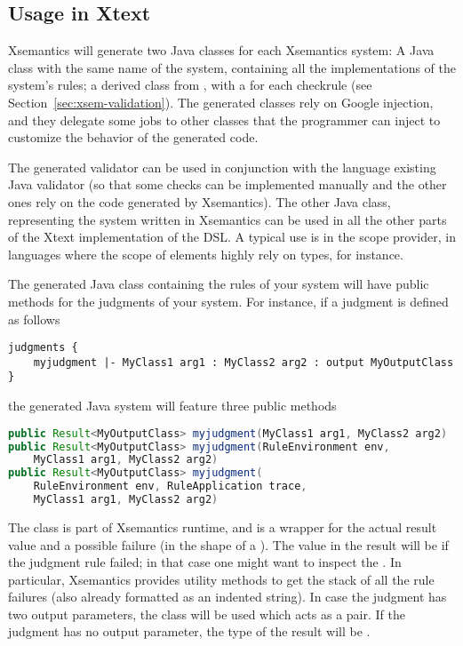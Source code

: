 \subsection{Usage in Xtext}

Xsemantics will generate two Java classes for each Xsemantics system:
A Java class with the same name of the system, containing all the
implementations of the system's rules; a derived class from
, with a \checkm{} for each checkrule (see
Section~\ref{sec:xsem-validation}).
The generated classes rely on Google injection, and they delegate some jobs to
other classes that the programmer can inject to customize the behavior of the
generated code.

The generated validator can be used in conjunction with the language existing
Java validator (so that some checks can be implemented manually and the other
ones rely on the code generated by Xsemantics).  The other Java class,
representing the system written in Xsemantics can be used in all the other parts
of the Xtext implementation of the DSL.  A typical use is in the scope provider,
in languages where the scope of elements highly rely on types, for instance.

The generated Java class containing the rules of your system will have
public methods for the judgments of your system.  For instance, if a judgment is
defined as follows


\begin{lstlisting}[language=xsemantics] 
judgments {
	myjudgment |- MyClass1 arg1 : MyClass2 arg2 : output MyOutputClass
}
\end{lstlisting}

\noindent
the generated Java system will feature three public methods

\begin{lstlisting}[language=Java] 
public Result<MyOutputClass> myjudgment(MyClass1 arg1, MyClass2 arg2)
public Result<MyOutputClass> myjudgment(RuleEnvironment env,
	MyClass1 arg1, MyClass2 arg2)
public Result<MyOutputClass> myjudgment(
	RuleEnvironment env, RuleApplication trace,
	MyClass1 arg1, MyClass2 arg2)
\end{lstlisting}

The class  is part of Xsemantics runtime, and is a wrapper for
the actual result value and a possible failure (in the shape of a \failedexc).
The value in the result will be  if the judgment rule failed; in that
case one might want to inspect the \failedexc.
In particular, Xsemantics provides utility methods to get the stack of all the
rule failures (also already formatted as an indented string).
In case the judgment has two output parameters, the class
 will be used which acts as a pair.
If the judgment has no output parameter, the type of the result will
be .

